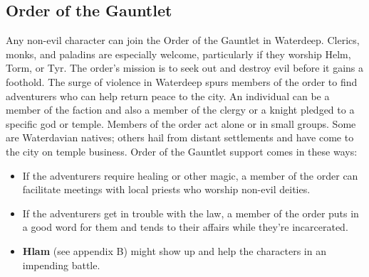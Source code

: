 \documentclass[10pt,a4paper,twoside,twocolumn,openany,nodeprecatedcode]{dndbook}
\begin{document}
\subsection{Order of the Gauntlet}
Any non-evil character can join the Order of the Gauntlet in Waterdeep. Clerics, monks, and paladins are especially welcome, particularly if they worship Helm, Torm, or Tyr.
The order's mission is to seek out and destroy evil before it gains a foothold. The surge of violence in Waterdeep spurs members of the order to find adventurers who can help return peace to the city.
An individual can be a member of the faction and also a member of the clergy or a knight pledged to a specific god or temple. Members of the order act alone or in small groups. Some are Waterdavian natives; others hail from distant settlements and have come to the city on temple business.
Order of the Gauntlet support comes in these ways:
\begin{itemize}

\item If the adventurers require healing or other magic, a member of the order can facilitate meetings with local priests who worship non-evil deities.
\item If the adventurers get in trouble with the law, a member of the order puts in a good word for them and tends to their affairs while they're incarcerated.
\item \textbf{Hlam} (see appendix B) might show up and help the characters in an impending battle.
\end{itemize}
\end{document}
